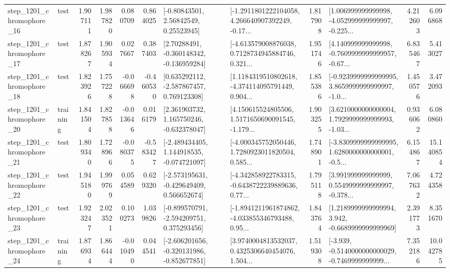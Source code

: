 \begin{tabular}{llrrrrllrlrr}
 step\_1201\_chromophore\_16 &      test &      1.907111 &    1.987820 &      0.080709 &  0.864025 &       [-0.80843501, 2.56842549, 0.25523945] &  [-1.2911801222104058, 4.266640907392249, -0.17... &       1.817908 &  [1.006999999999998, -4.052999999999997, -0.225... &            4.212603 &          6.096868 \\
 step\_1201\_chromophore\_17 &      test &      1.878267 &    1.905934 &      0.027667 &  0.387403 &    [2.70288491, -0.360148342, -0.136959284] &  [-4.613579008876038, 0.7128734945884746, 0.321... &       1.951746 &  [4.140999999999998, -0.7609999999999957, -0.67... &            6.835467 &          5.413027 \\
 step\_1201\_chromophore\_18 &      test &      1.823926 &    1.757228 &     -0.066698 & -0.460530 &    [0.635292112, -2.587867457, 0.769123308] &  [1.1184319510802618, -4.374114095791449, 0.904... &       1.855386 &  [-0.9239999999999995, 3.8659999999999997, -1.0... &            1.450576 &          3.472093 \\
 step\_1201\_chromophore\_20 &  training &      1.841504 &    1.827858 &     -0.013646 &  0.016179 &    [2.361903732, 1.165750246, -0.632378047] &  [4.150615524805506, 1.5171650690091545, -1.179... &       1.903255 &  [3.6210000000000004, 1.7929999999999993, -1.03... &            0.936062 &          6.080860 \\
 step\_1201\_chromophore\_21 &      test &      1.809340 &    1.728966 &     -0.080375 & -0.583427 &   [-2.489434405, 1.144918535, -0.074721097] &  [-4.000345752050446, 1.7280923011820504, 0.585... &       1.748901 &  [-3.8309999999999995, 1.6280000000000001, -0.5... &            6.154867 &         15.140854 \\
 step\_1201\_chromophore\_22 &      test &      1.945180 &    1.999769 &      0.054589 &  0.629320 &   [-2.573195631, -0.429649409, 0.566652674] &  [-4.342858922783315, -0.6438722239889636, 0.77... &       1.795118 &  [3.991999999999999, 0.5549999999999997, -0.378... &            7.067632 &          4.724358 \\
 step\_1201\_chromophore\_23 &      test &      1.923247 &    2.023521 &      0.100273 &  1.039826 &   [-0.899570791, -2.594209751, 0.375293456] &  [-1.8941211961874862, -4.033855346793488, 0.95... &       1.843764 &   [1.2189999999999994, 3.942, -0.6689999999999969] &            2.391773 &          8.351670 \\
 step\_1201\_chromophore\_24 &  training &      1.876934 &    1.866444 &     -0.010490 &  0.044541 &  [-2.606201656, -0.320131986, -0.852677851] &  [3.9740004813532037, 0.4325306640454076, 1.504... &       1.519308 &  [-3.939, -0.5140000000000029, -0.7469999999999... &            7.352186 &         10.042785 \\

\end{tabular}
